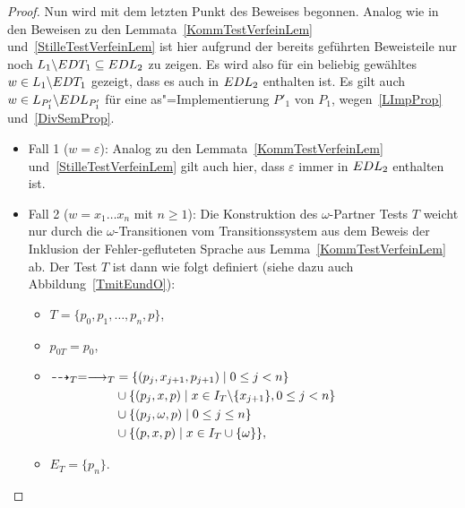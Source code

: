 \begin{proof}
  Nun wird mit dem letzten Punkt des Beweises begonnen. Analog wie in den
  Beweisen zu den Lemmata~\ref{KommTestVerfeinLem} und~\ref{StilleTestVerfeinLem}
  ist hier aufgrund der bereits geführten Beweisteile nur noch $L_1\backslash
  EDT _1 \subseteq EDL _2$ zu zeigen. Es wird also für ein beliebig gewähltes
  $w\in L_1\backslash EDT _1$ gezeigt, dass es auch in $EDL _2$ enthalten
  ist. Es gilt auch $w\in L _{P'_1}\backslash EDL _{P'_1}$ für eine
  as"=Implementierung $P'_1$ von $P_1$, wegen~\ref{LImpProp}
  und~\ref{DivSemProp}.
  \begin{itemize}
    \item Fall 1 ($w = \varepsilon$): Analog zu den
      Lemmata~\ref{KommTestVerfeinLem} und~\ref{StilleTestVerfeinLem} gilt auch
      hier, dass $\varepsilon$ immer in $EDL _2$ enthalten ist.
    \item Fall 2 ($w = x_1\dots x_n$ mit $n \geq 1$): Die Konstruktion des
      $\omega$-Partner Tests $T$ weicht nur durch die $\omega$-Transitionen vom
      Transitionssystem aus dem Beweis der Inklusion der Fehler-gefluteten
      Sprache \EL{} aus Lemma~\ref{KommTestVerfeinLem} ab. Der Test $T$ ist
      dann wie folgt definiert (siehe dazu auch Abbildung~\ref{TmitEundO}):
      \begin{itemize}
        \item $T=\{p_0,p_1,\dots ,p_n,p\}$,
        \item $p_{0T}=p_0$,
        \item $\begin{aligned}[t]
            \may _T = \must _T &= \{(p_j,x_{j+1},p_{j+1})\mid 0\leq j< n\}\\
            &\cup\{(p_j,x,p)\mid x\in I_T\backslash\{x_{j+1}\},0\leq j < n\}\\
            &\cup\{(p_j,\omega ,p)\mid 0\leq j\leq n\}\\
            &\cup\{(p,x ,p)\mid x\in I_T\cup \{\omega\}\},
        \end{aligned}$
        \item $E_T=\{p_n\}$.
      \end{itemize}
      \begin{figure} [h!tbp]
      \begin{center}
\end{center}
\end{figure}
\end{itemize}
\end{proof}
